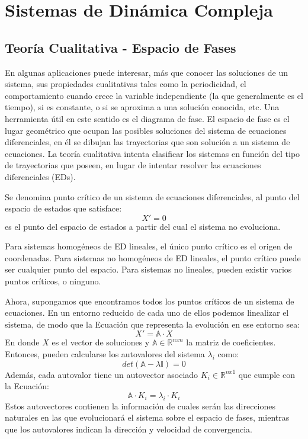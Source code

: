 \chapter{Sistemas de Dinámica Compleja}
\label{capSist}



\section{Teoría Cualitativa - Espacio de Fases}
En algunas aplicaciones puede interesar, más que conocer las soluciones de un sistema, sus propiedades cualitativas tales como la periodicidad, el comportamiento cuando crece la variable independiente (la que generalmente es el tiempo), si es constante, o si se aproxima a una solución conocida, etc.
Una herramienta útil en este sentido es el diagrama de fase.
El espacio de fase es el lugar geométrico que ocupan las posibles soluciones del sistema de ecuaciones diferenciales, en él se dibujan las trayectorias que son solución a un sistema de ecuaciones.
La teoría cualitativa intenta clasificar los sistemas en función del tipo de trayectorias que poseen, en lugar de intentar resolver las ecuaciones diferenciales (EDs).

Se denomina punto crítico de un sistema de ecuaciones diferenciales, al punto del espacio de estados que satisface:
\begin{equation}
X'=0
\end{equation}
es el punto del espacio de estados a partir del cual el sistema no evoluciona.

Para sistemas homogéneos de ED lineales, el único punto crítico es el origen de coordenadas. Para sistemas no homogéneos de ED lineales, el punto crítico puede ser cualquier punto del espacio. Para sistemas no lineales, pueden existir varios puntos críticos, o ninguno.

Ahora, supongamos que encontramos todos los puntos críticos de un sistema de ecuaciones.
En un entorno reducido de cada uno de ellos podemos linealizar el sistema, de modo que la Ecuación que representa la evolución en ese entorno sea:
\begin{equation}
X' = \mathbb{A} \cdot X
\end{equation}
En donde $X$ es el vector de soluciones y $\mathbb{A} \in \mathbb{R}^{nxn}$ la matriz de coeficientes.
Entonces, pueden calcularse los autovalores del sistema $\lambda_i$ como:
\begin{equation}
det(\mathbb{A}-\lambda \mathbb{I}) = 0
\end{equation}
Además, cada autovalor tiene un autovector asociado $K_i \in \mathbb{R}^{nx1}$ que cumple con la Ecuación:
\begin{equation}
	\mathbb{A} \cdot K_i = \lambda_i \cdot K_i
\end{equation}
Estos autovectores contienen la información de cuales serán las direcciones naturales en las que evolucionará el sistema sobre el espacio de fases, mientras que los autovalores indican la dirección y velocidad de convergencia.

